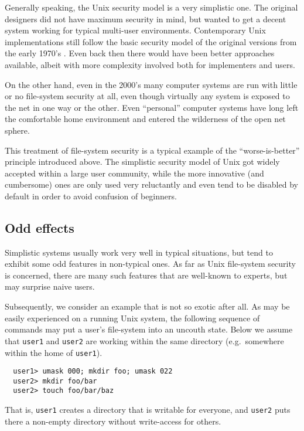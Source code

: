 \documentclass[11pt,a4paper]{article}
\begin{document}
\medskip Generally speaking, the Unix security model is a very simplistic one.
The original designers did not have maximum security in mind, but wanted to
get a decent system working for typical multi-user environments.  Contemporary
Unix implementations still follow the basic security model of the original
versions from the early 1970's \cite{Unix-heritage}.  Even back then there
would have been better approaches available, albeit with more complexity
involved both for implementers and users.

On the other hand, even in the 2000's many computer systems are run with
little or no file-system security at all, even though virtually any system is
exposed to the net in one way or the other.  Even ``personal'' computer
systems have long left the comfortable home environment and entered the
wilderness of the open net sphere.

\medskip This treatment of file-system security is a typical example of the
``worse-is-better'' principle introduced above.  The simplistic security model
of Unix got widely accepted within a large user community, while the more
innovative (and cumbersome) ones are only used very reluctantly and even tend
to be disabled by default in order to avoid confusion of beginners.


\subsection{Odd effects}

Simplistic systems usually work very well in typical situations, but tend to
exhibit some odd features in non-typical ones.  As far as Unix file-system
security is concerned, there are many such features that are well-known to
experts, but may surprise naive users.

Subsequently, we consider an example that is not so exotic after all.  As may
be easily experienced on a running Unix system, the following sequence of
commands may put a user's file-system into an uncouth state.  Below we assume
that \texttt{user1} and \texttt{user2} are working within the same directory
(e.g.\ somewhere within the home of \texttt{user1}).

{\small
\begin{verbatim}
  user1> umask 000; mkdir foo; umask 022
  user2> mkdir foo/bar
  user2> touch foo/bar/baz
\end{verbatim}
}
  
That is, \texttt{user1} creates a directory that is writable for everyone, and
\texttt{user2} puts there a non-empty directory without write-access for
others.
\end{document}
